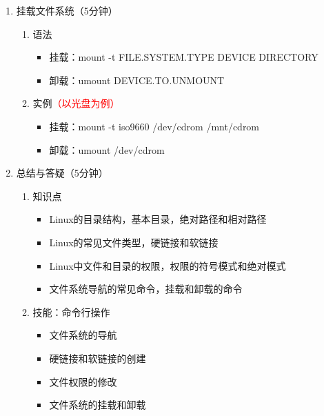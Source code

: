 \documentclass{TIJMUjiaoanLL}
\begin{document}
\begin{enumerate}
\otherTail
\newpage
\otherHeader

  \item 挂载文件系统（5分钟）
    \begin{enumerate}
      \item 语法
        \begin{itemize}
          \item 挂载：mount -t FILE.SYSTEM.TYPE DEVICE DIRECTORY
          \item 卸载：umount DEVICE.TO.UNMOUNT
        \end{itemize}
      \item 实例\textcolor{red}{（以光盘为例）}
        \begin{itemize}
          \item 挂载：mount -t iso9660 /dev/cdrom /mnt/cdrom
          \item 卸载：umount /dev/cdrom
        \end{itemize}
    \end{enumerate}

  \item 总结与答疑（5分钟）
    \begin{enumerate}
      \item 知识点
	\begin{itemize}
	  \item Linux的目录结构，基本目录，绝对路径和相对路径
	  \item Linux的常见文件类型，硬链接和软链接
	  \item Linux中文件和目录的权限，权限的符号模式和绝对模式
	  \item 文件系统导航的常见命令，挂载和卸载的命令
	\end{itemize}
      \item 技能：命令行操作
	\begin{itemize}
          \item 文件系统的导航
          \item 硬链接和软链接的创建
          \item 文件权限的修改
          \item 文件系统的挂载和卸载
	\end{itemize}
    \end{enumerate}

\end{enumerate}

\otherTail
\end{document}
